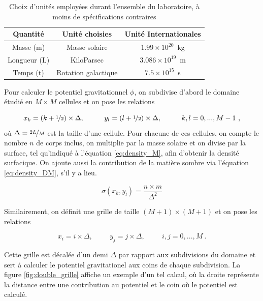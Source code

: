 \documentclass{article}
\begin{document}
\begin{table}[H]
	\centering
	\begin{tabular}{|c|c|c|}
		\hline
		Quantité & Unité choisies & Unité Internationales\\
		\hline
		Masse (m) & Masse solaire & $1.99\times10^{20}$\ kg\\ 
		Longueur (L) & KiloParsec & $3.086\times10^{19}$\ m\\ 
		Temps (t) & Rotation galactique & $7.5 \times 10^{15}$\ s \\ 
		\hline
	\end{tabular}
	\caption{Choix d'unités employées durant l'ensemble du laboratoire, à moins de spécifications contraires}
	\label{tab:units}
\end{table}

Pour calculer le potentiel gravitationnel $\phi$, on subdivise d'abord le domaine étudié en $M \times M$ cellules et on pose les relations 

\begin{equation*}
x_k = (k+\nicefrac{1}{2}) \times \Delta, \hspace{1cm} y_l = (l +\nicefrac{1}{2}) \times \Delta, \hspace{1cm} k, l = 0, ..., M-1\ ,
\end{equation*}
où $\Delta = \nicefrac{2L}{M}$ est la taille d'une cellule. Pour chacune de ces cellules, on compte le nombre $n$ de corps inclus, on multiplie par la masse solaire et on divise par la surface, tel qu'indiqué à l'équation \ref{eq:density_M}, afin d'obtenir la densité surfacique. On ajoute aussi la contribution de la matière sombre via l'équation \ref{eq:density_DM}, s'il y a lieu.

\begin{equation}\label{eq:density_M}
\sigma(x_k, y_l) = \frac{n \times m}{\Delta^2}
\end{equation}

Similairement, on définit une grille de taille $(M+1) \times (M+1)$ et on pose les relations

\begin{equation*}
x_i = i \times \Delta, \hspace{1cm} y_j = j \times \Delta, \hspace{1cm} i, j = 0, ..., M\ .
\end{equation*}

Cette grille est décalée d'un demi $\Delta$ par rapport aux subdivisions du domaine et sert à calculer le potentiel gravitationel aux coins de chaque subdivision. La figure \ref{fig:double_grille} affiche un exemple d'un tel calcul, où la droite représente la distance entre une contribution au potentiel et le coin où le potentiel est calculé.
\end{document}
